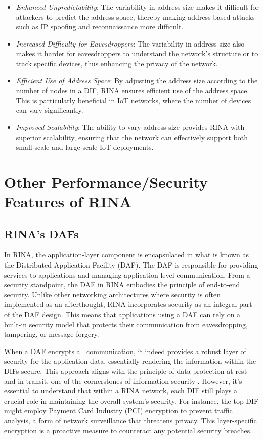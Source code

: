 \documentclass{ieeeaccess}
\begin{document}
\begin{itemize}
	\item \textit{Enhanced Unpredictability}: The variability in address size makes it difficult for attackers to predict the address space, thereby making address-based attacks such as IP spoofing and reconnaissance more difficult.
	\item \textit{Increased Difficulty for Eavesdroppers}: The variability in address size also makes it harder for eavesdroppers to understand the network's structure or to track specific devices, thus enhancing the privacy of the network.
	\item \textit{Efficient Use of Address Space}: By adjusting the address size according to the number of nodes in a DIF, RINA ensures efficient use of the address space. This is particularly beneficial in IoT networks, where the number of devices can vary significantly.
	\item \textit{Improved Scalability}: The ability to vary address size provides RINA with superior scalability, ensuring that the network can effectively support both small-scale and large-scale IoT deployments.
\end{itemize}

\section{Other Performance/Security Features of RINA} 
\label{sec:rina-other}
\subsection{RINA's DAFs}
In RINA, the application-layer component is encapsulated in what is known as the Distributed Application Facility (DAF). The DAF is responsible for providing services to applications and managing application-level communication. From a security standpoint, the DAF in RINA embodies the principle of end-to-end security. Unlike other networking architectures where security is often implemented as an afterthought, RINA incorporates security as an integral part of the DAF design. This means that applications using a DAF can rely on a built-in security model that protects their communication from eavesdropping, tampering, or message forgery.

When a DAF encrypts all communication, it indeed provides a robust layer of security for the application data, essentially rendering the information within the DIFs secure. This approach aligns with the principle of data protection at rest and in transit, one of the cornerstones of information security \cite{kunchok2018lightweight}. However, it's essential to understand that within a RINA network, each DIF still plays a crucial role in maintaining the overall system's security. For instance, the top DIF might employ Payment Card Industry (PCI) encryption \cite{liu2010survey} to prevent traffic analysis, a form of network surveillance that threatens privacy. This layer-specific encryption is a proactive measure to counteract any potential security breaches.
\end{document}
